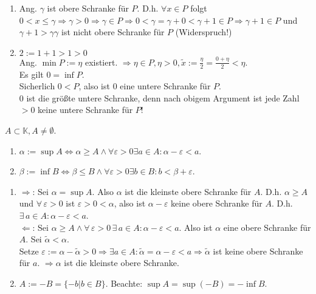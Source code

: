 \documentclass[../ana1.tex]{subfiles}
\begin{document}
\begin{bew}\leavevmode
	\begin{enumerate}
		\item Ang. \( \gamma \) ist obere Schranke für \(P\). D.h. \( \forall x \in P\) folgt \(0<x\leq\gamma\Rightarrow\gamma >0\Rightarrow \gamma \in P \Rightarrow 0 < \gamma = \gamma + 0 < \gamma + 1 \in P\Rightarrow\gamma + 1\in P\) und \( \gamma +1>\gamma \gamma \) ist nicht obere Schranke für \(P\) (Widerspruch!)\ \Lightning{}
		\item \(2:= 1+1 > 1>0\) \\
			Ang. \( \min P := \eta \) existiert. \( \Rightarrow \eta \in P, \eta > 0, \tilde{x} := \frac{\eta}{2} = \frac{0 + \eta}{2} < \eta \).\\
			Es gilt \(0 = \inf P\).\\
			Sicherlich \(0<P\), also ist \(0\) eine untere Schranke für \(P\).\\
			\(0\) ist die größte untere Schranke, denn nach obigem Argument ist jede Zahl \(>0\) keine untere Schranke für \(P\)!
	\end{enumerate}
\end{bew}
\begin{lem}
	\(A\subset\mathbb{K}, A\neq \emptyset \).
	\begin{enumerate}
		\item \( \alpha := \sup A \Leftrightarrow \alpha \geq A \wedge \forall \varepsilon > 0 \exists a \in A: \alpha - \varepsilon < a\).
		\item \( \beta := \inf B \Leftrightarrow \beta \leq B \wedge \forall \varepsilon > 0 \exists b \in B: b < \beta + \varepsilon \).
	\end{enumerate}
\end{lem}
\begin{bew}\leavevmode
	\begin{enumerate}
		\item \glqq{}\( \Rightarrow \)\grqq: Sei \( \alpha = \sup A\). Also \( \alpha \) ist die kleinste obere Schranke für \(A\). D.h. \( \alpha \geq A\) und \( \forall \, \varepsilon > 0\) ist \( \varepsilon>0<\alpha \), also ist \( \alpha-\varepsilon \) keine obere Schranke für \(A\). D.h. \( \exists \, a\in A:\alpha - \varepsilon <a\).\\
			\glqq{}\( \Leftarrow \)\grqq: Sei \( \alpha \geq A \wedge \forall \, \varepsilon > 0 \, \exists \, a \in A: \alpha - \varepsilon < a\). Also ist \( \alpha \) eine obere Schranke für \(A\). Sei \( \tilde{\alpha}<\alpha \).\\
			Setze \( \varepsilon:= \alpha -\tilde{\alpha} > 0 \Rightarrow \exists a \in A: \tilde{\alpha} = \alpha - \varepsilon < a \Rightarrow \tilde{\alpha}\) ist keine obere Schranke für \(a\). \( \Rightarrow\alpha \) ist die kleinste obere Schranke.
		\item \( A:= -B = \{-b|b \in B\} \). Beachte: \(\sup A = \sup(-B) = -\inf B\).
	\end{enumerate}
\end{bew}
\end{document}
